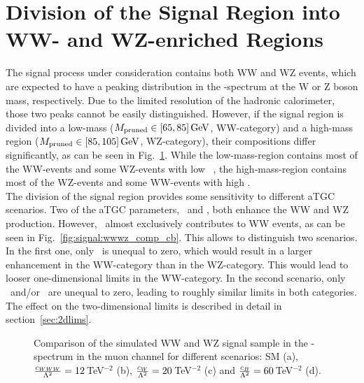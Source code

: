 \section{Division of the Signal Region into WW- and WZ-enriched Regions}
The signal process under consideration contains both WW and WZ events, which are expected to have a peaking distribution in the \Mpr -spectrum at the W or Z boson mass, respectively. Due to the limited resolution of the hadronic calorimeter, those two peaks cannot be easily distinguished. However, if the signal region is divided into a low-mass ($M_\mathrm{pruned} \in [65,85]\,{\rm GeV}$, WW-category) and a high-mass region ($M_\mathrm{pruned} \in [85,105]\,{\rm GeV}$, WZ-category), their compositions differ significantly, as can be seen in Fig.~\ref{fig:signal:wwwz_comp}. While the low-mass-region contains most of the WW-events and some WZ-events with low \Mpr \ , the high-mass-region contains most of the WZ-events and some WW-events with high \Mpr .\\

\noindent The division of the signal region provides some sensitivity to different aTGC scenarios. Two of the aTGC parameters, \Tcwww \ and \Tccw , both enhance the WW and WZ production. However, \Tcb \ almost exclusively contributes to WW events, as can be seen in Fig.~\ref{fig:signal:wwwz_comp_cb}. This allows to distinguish two scenarios. In the first one, only \Tcb \ is unequal to zero, which would result in a larger enhancement in the WW-category than in the WZ-category. This would lead to looser one-dimensional limits in the WW-category. In the second scenario, only \Tcwww \ and/or \Tccw \ are unequal to zero, leading to roughly similar limits in both categories. The effect on the two-dimensional limits is described in detail in section~\ref{sec:2dlims}.\\
\begin{figure}
	\centering
	\caption[Comparison of the simulated WW and WZ signal sample in the \Mpr -spectrum in the muon channel]{Comparison of the simulated WW and WZ signal sample in the \Mpr -spectrum in the muon channel for different scenarios: SM (a), $\frac{c_{WWW}}{\Lambda^2}=12$\,TeV$^{-2}$ (b), $\frac{c_{W}}{\Lambda^2}=20$\,TeV$^{-2}$ (c) and $\frac{c_{B}}{\Lambda^2}=60$\,TeV$^{-2}$ (d). }
	\label{fig:signal:wwwz_comp}
\end{figure}


